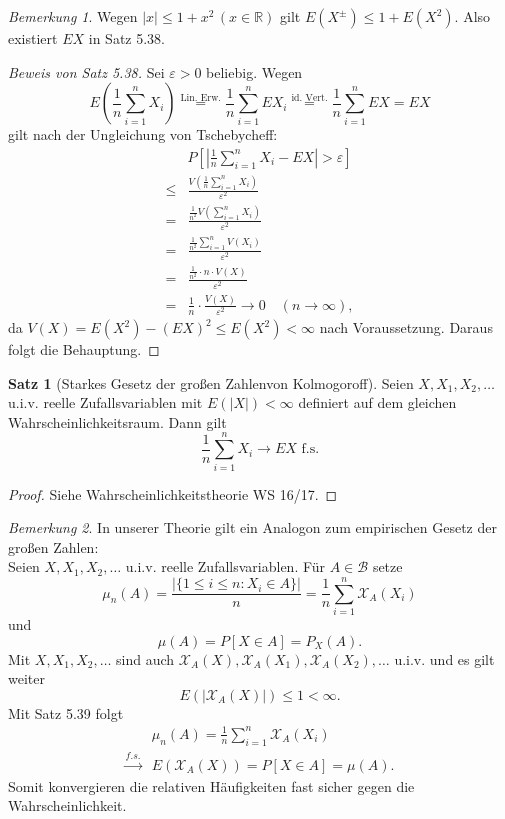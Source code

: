 \documentclass[a4paper,12pt,fleqn]{scrartcl}
\newcommand{\R}{\mathbb{R}}
\newcommand{\m}[1]{\mathcal{ #1 }}
\newcommand{\WR}{Wahrscheinlichkeitsraum}
\newcommand{\ZV}{Zufallsvariable}
\theoremstyle{definition}
\newtheorem{satz}[definition]{Satz}
\theoremstyle{plain}
\theoremstyle{remark}
\newtheorem*{bemerkung}{Bemerkung}
\begin{document}
\begin{bemerkung}
Wegen $|x| \leq 1 + x^2 \, (x \in \R)$ gilt $E(X^\pm) \leq1 + E(X^2)$. Also existiert $EX$ in Satz 5.38.
\end{bemerkung}
\begin{proof}[Beweis von Satz 5.38]
Sei $\varepsilon > 0$ beliebig. Wegen
\[E(\frac{1}{n} \sum_{i=1}^{n} X_i) \overset{\text{Lin. Erw.}}{=} \frac{1}{n} \sum_{i=1}^{n} EX_i \overset{\text{id. Vert.}}{=} \frac{1}{n} \sum_{i=1}^{n} EX = EX\]
gilt nach der Ungleichung von Tschebycheff:
\begin{align*}
&P[|\frac{1}{n} \sum_{i=1}^{n} X_i - EX| > \varepsilon] \\
\leq&\frac{V(\frac{1}{n} \sum_{i=1}^{n} X_i)}{\varepsilon^2} \\
=&\frac{\frac{1}{n^2} V(\sum_{i=1}^{n} X_i)}{\varepsilon^2}  \\
=&\frac{\frac{1}{n^2} \sum_{i=1}^{n} V(X_i)}{\varepsilon^2} \tag{$X_i$ unabhängig} \\
=&\frac{\frac{1}{n^2} \cdot n \cdot V(X)}{\varepsilon^2} \tag{id. Vert.} \\
=&\frac{1}{n} \cdot \frac{V(X)}{\varepsilon^2} \rightarrow 0 \quad (n \rightarrow \infty),
\end{align*}
da $V(X) = E(X^2) - (EX)^2 \leq E(X^2) < \infty$ nach Voraussetzung. Daraus folgt die Behauptung.
\end{proof}
\begin{satz}[Starkes Gesetz der großen Zahlenvon Kolmogoroff]
Seien $X, X_1, X_2, \ldots$ u.i.v. reelle \ZV n mit $E(|X|) < \infty$ definiert auf dem gleichen \WR . Dann gilt
\[\frac{1}{n} \sum_{i=1}^n X_i \rightarrow EX \text{ f.s.}\]
\end{satz}
\begin{proof}
Siehe Wahrscheinlichkeitstheorie WS 16/17.
\end{proof}
\begin{bemerkung}
In unserer Theorie gilt ein Analogon zum empirischen Gesetz der großen Zahlen: \\
Seien $X, X_1, X_2,\ldots$ u.i.v. reelle \ZV n. Für $A \in \m{B}$ setze
\[\mu_n(A) = \frac{|\{1 \leq i \leq n : X_i \in A\}|}{n} = \frac{1}{n} \sum_{i=1}^n \m{X}_A(X_i)\]
und 
\[\mu(A) = P[X \in A] = P_X(A).\]
Mit $X, X_1, X_2, \ldots$ sind auch $\m{X}_A(X), \m{X}_A(X_1), \m{X}_A(X_2), \ldots$ u.i.v. und es gilt weiter
\[E(|\m{X}_A(X)|) \leq 1 < \infty.\]
Mit Satz 5.39 folgt
\begin{align*}
&\mu_n(A) = \frac{1}{n} \sum_{i=1}^n \m{X}_A(X_i) \\
\stackrel{f.s.}{\rightarrow} & E(\m{X}_A(X)) = P[X \in A] = \mu(A).
\end{align*}
Somit konvergieren die relativen Häufigkeiten fast sicher gegen die Wahrscheinlichkeit.
\end{bemerkung}
\end{document}
